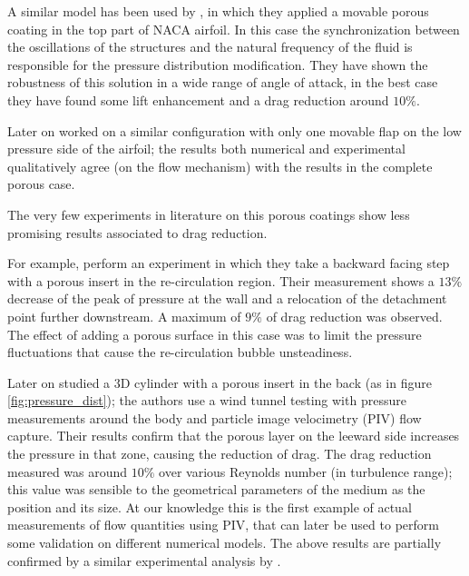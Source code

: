 A similar model has been used by \citet{venkataraman2012numerical}, in which they applied a movable porous coating in the top part of NACA airfoil.
In this case the synchronization between the oscillations of the structures and the natural frequency of the fluid is responsible for the pressure distribution modification.
They have shown the robustness of this solution in a wide range of angle of attack, in the best case they have found some lift enhancement and a drag reduction around $10\%$.

Later on \citet{rosti2017pelskin} worked on a similar configuration with only one movable flap on the low pressure side of the airfoil; the results both numerical and experimental qualitatively agree (on the flow mechanism) with the results in the complete porous case.


The very few experiments in literature on this porous coatings show less promising results associated to drag reduction.

For example, \citet{heenan1998passive} perform an experiment in which they take a backward facing step with a porous insert in the re-circulation region.
Their measurement shows a $13\%$ decrease of the peak of pressure at the wall and a relocation of the detachment point further downstream.
A maximum of $9\%$ of drag reduction was observed.
The effect of adding a porous surface in this case was to limit the pressure fluctuations that cause the re-circulation bubble unsteadiness.

Later on \citet{klausmann2017drag} studied a 3D cylinder with a porous insert in the back (as in figure \ref{fig:pressure_dist}); the authors use a wind tunnel testing with pressure measurements around the body and particle image velocimetry (PIV) flow capture.
Their results confirm that the porous layer on the leeward side increases the pressure in that zone, causing the reduction of drag.
The drag reduction measured was around $10\%$ over various Reynolds number (in turbulence range); this value was sensible to the geometrical parameters of the medium as the position and its size.
At our knowledge this is the first example of actual measurements of flow quantities using PIV, that can later be used to perform some validation on different numerical models.
The above results are partially confirmed by a similar experimental analysis by \citet{grizzetti2015esperimenti}.

